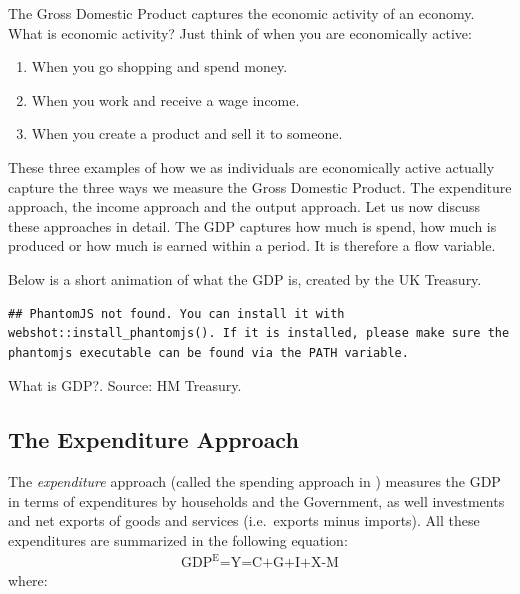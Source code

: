 \documentclass[]{book}
\providecommand{\tightlist}{%
  \setlength{\itemsep}{0pt}\setlength{\parskip}{0pt}}
\begin{document}
The Gross Domestic Product captures the economic activity of an economy. What is economic activity? Just think of when you are economically active:

\begin{enumerate}
\def\labelenumi{\arabic{enumi}.}
\tightlist
\item
  When you go shopping and spend money.
\item
  When you work and receive a wage income.
\item
  When you create a product and sell it to someone.
\end{enumerate}

These three examples of how we as individuals are economically active actually capture the three ways we measure the Gross Domestic Product. The expenditure approach, the income approach and the output approach. Let us now discuss these approaches in detail. The GDP captures how much is spend, how much is produced or how much is earned within a period. It is therefore a flow variable.

Below is a short animation of what the GDP is, created by the UK Treasury.

\begin{verbatim}
## PhantomJS not found. You can install it with webshot::install_phantomjs(). If it is installed, please make sure the phantomjs executable can be found via the PATH variable.
\end{verbatim}

\label{fig:whatisgdp}What is GDP?. Source: HM Treasury.

\hypertarget{the-expenditure-approach}{%
\subsection{The Expenditure Approach}\label{the-expenditure-approach}}

The \emph{expenditure} approach (called the spending approach in \citep{core}) measures the GDP in terms of expenditures by households and the Government, as well investments and net exports of goods and services (i.e.~exports minus imports). All these expenditures are summarized in the following equation:
\begin{align}
   \text{GDP}^{\text{E}} \text{=Y=C+G+I+X-M}
\end{align}
where:
\end{document}
